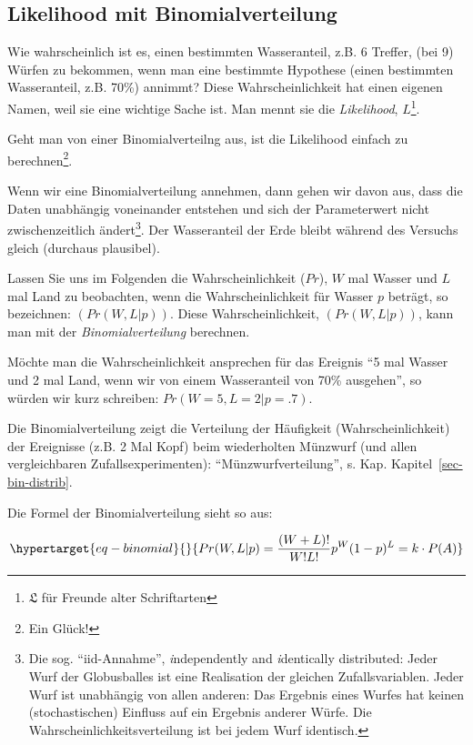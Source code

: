 \documentclass[
  a4paper,
  DIV=11]{scrreprt}
\theoremstyle{definition}
\theoremstyle{remark}
\begin{document}
\hypertarget{likelihood-mit-binomialverteilung}{%
\subsection{Likelihood mit
Binomialverteilung}\label{likelihood-mit-binomialverteilung}}

Wie wahrscheinlich ist es, einen bestimmten Wasseranteil, z.B. 6
Treffer, (bei 9) Würfen zu bekommen, wenn man eine bestimmte Hypothese
(einen bestimmten Wasseranteil, z.B. 70\%) annimmt? Diese
Wahrscheinlichkeit hat einen eigenen Namen, weil sie eine wichtige Sache
ist. Man mennt sie die \emph{Likelihood}, \(L\)\footnote{\(\mathfrak{L}\)
  für Freunde alter Schriftarten}.

Geht man von einer Binomialverteilng aus, ist die Likelihood einfach zu
berechnen\footnote{Ein Glück!}.

Wenn wir eine Binomialverteilung annehmen, dann gehen wir davon aus,
dass die Daten unabhängig voneinander entstehen und sich der
Parameterwert nicht zwischenzeitlich ändert\footnote{Die sog.
  ``iid-Annahme'', \emph{i}ndependently and \emph{i}dentically
  distributed: Jeder Wurf der Globusballes ist eine Realisation der
  gleichen Zufallsvariablen. Jeder Wurf ist unabhängig von allen
  anderen: Das Ergebnis eines Wurfes hat keinen (stochastischen)
  Einfluss auf ein Ergebnis anderer Würfe. Die
  Wahrscheinlichkeitsverteilung ist bei jedem Wurf identisch.}. Der
Wasseranteil der Erde bleibt während des Versuchs gleich (durchaus
plausibel).

Lassen Sie uns im Folgenden die Wahrscheinlichkeit (\(Pr\)), \(W\) mal
Wasser und \(L\) mal Land zu beobachten, wenn die Wahrscheinlichkeit für
Wasser \(p\) beträgt, so bezeichnen: \((Pr(W,L | p))\). Diese
Wahrscheinlichkeit, \((Pr(W,L | p))\), kann man mit der
\emph{Binomialverteilung} berechnen.

Möchte man die Wahrscheinlichkeit ansprechen für das Ereignis ``5 mal
Wasser und 2 mal Land, wenn wir von einem Wasseranteil von 70\%
ausgehen'', so würden wir kurz schreiben: \(Pr(W=5, L=2 | p=.7)\).

Die Binomialverteilung zeigt die Verteilung der Häufigkeit
(Wahrscheinlichkeit) der Ereignisse (z.B. 2 Mal Kopf) beim wiederholten
Münzwurf (und allen vergleichbaren Zufallsexperimenten):
``Münzwurfverteilung'', s. Kap. Kapitel~\ref{sec-bin-distrib}.

Die Formel der Binomialverteilung sieht so aus:

\begin{equation}\protect\hypertarget{eq-binomial}{}{Pr(W,L|p) = \frac{(W+L)!}{W!L!}p^W(1-p)^L = k \cdot P(A)}\label{eq-binomial}\end{equation}
\end{document}
